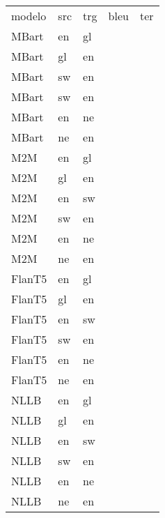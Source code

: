 \begin{tabular}{lllrr}
modelo & src & trg & bleu & ter \\
MBart & en & gl &  &  \\
MBart & gl & en &  &  \\
MBart & sw & en &  &  \\
MBart & sw & en &  &  \\
MBart & en & ne &  &  \\
MBart & ne & en &  &  \\
M2M & en & gl &  &  \\
M2M & gl & en &  &  \\
M2M & en & sw &  &  \\
M2M & sw & en &  &  \\
M2M & en & ne &  &  \\
M2M & ne & en &  &  \\
FlanT5 & en & gl &  &  \\
FlanT5 & gl & en &  &  \\
FlanT5 & en & sw &  &  \\
FlanT5 & sw & en &  &  \\
FlanT5 & en & ne &  &  \\
FlanT5 & ne & en &  &  \\
NLLB & en & gl &  &  \\
NLLB & gl & en &  &  \\
NLLB & en & sw &  &  \\
NLLB & sw & en &  &  \\
NLLB & en & ne &  &  \\
NLLB & ne & en &  &  \\
\end{tabular}
